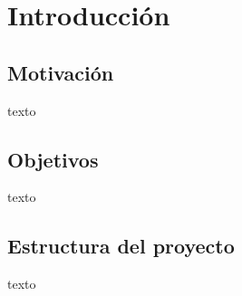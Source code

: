 \chapter{Introducción}


\section{Motivación}

texto

\section{Objetivos}

texto

\section{Estructura del proyecto}

texto

